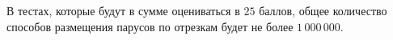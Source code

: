 В тестах, которые будут в сумме оцениваться в $25$ баллов, общее количество способов размещения парусов по отрезкам будет не более $1\,000\,000$. 